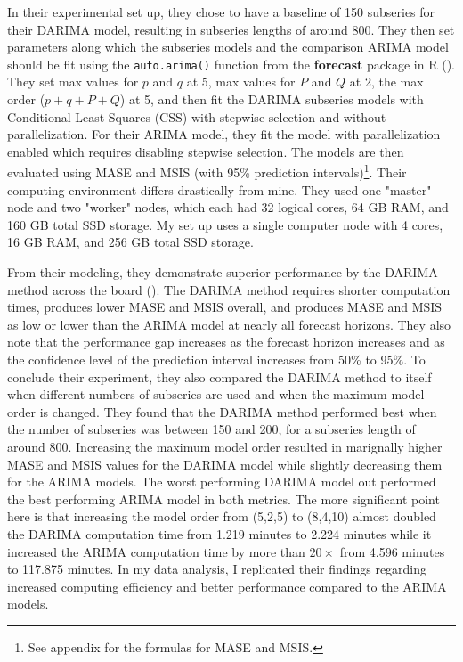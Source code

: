 \documentclass[
]{article}
\begin{document}
In their experimental set up, they chose to have a baseline of 150 subseries for their DARIMA model, resulting in subseries lengths of around 800. They then set parameters along which the subseries models and the comparison ARIMA model should be fit using the \texttt{auto.arima()} function from the \textbf{forecast} package in R (\cite[p.~23]{wang_distributed_2020}). They set max values for $p$ and $q$ at 5, max values for $P$ and $Q$ at 2, the max order ($p + q + P + Q$) at 5, and then fit the DARIMA subseries models with Conditional Least Squares (CSS) with stepwise selection and without parallelization. For their ARIMA model, they fit the model with parallelization enabled which requires disabling stepwise selection. The models are then evaluated using MASE and MSIS (with 95\% prediction intervals)\footnote{See appendix for the formulas for MASE and MSIS.}. Their computing environment differs drastically from mine. They used one "master" node and two "worker" nodes, which each had 32 logical cores, 64 GB RAM, and 160 GB total SSD storage. My set up uses a single computer node with 4 cores, 16 GB RAM, and 256 GB total SSD storage. 

From their modeling, they demonstrate superior performance by the DARIMA method across the board (\cite[p.~25-31]{wang_distributed_2020}). The DARIMA method requires shorter computation times, produces lower MASE and MSIS overall, and produces MASE and MSIS as low or lower than the ARIMA model at nearly all forecast horizons. They also note that the performance gap increases as the forecast horizon increases and as the confidence level of the prediction interval increases from 50\% to 95\%. To conclude their experiment, they also compared the DARIMA method to itself when different numbers of subseries are used and when the maximum model order is changed. They found that the DARIMA method performed best when the number of subseries was between 150 and 200, for a subseries length of around 800. Increasing the maximum model order resulted in marignally higher MASE and MSIS values for the DARIMA model while slightly decreasing them for the ARIMA models. The worst performing DARIMA model out performed the best performing ARIMA model in both metrics. The more significant point here is that increasing the model order from (5,2,5) to (8,4,10) almost doubled the DARIMA computation time from 1.219 minutes to 2.224 minutes while it increased the ARIMA computation time by more than $20\times$ from 4.596 minutes to 117.875 minutes. In my data analysis, I replicated their findings regarding increased computing efficiency and better performance compared to the ARIMA models. %
\end{document}
